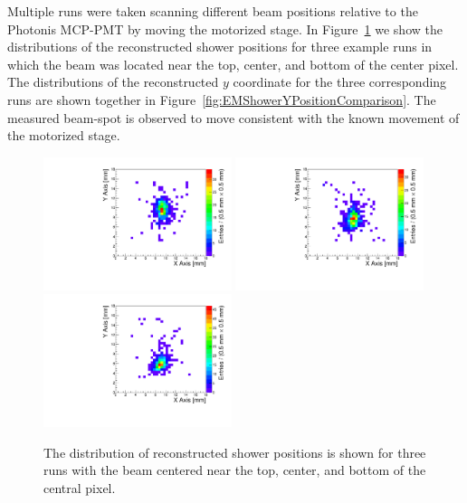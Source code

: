\documentclass[12pt]{article}
\begin{document}
Multiple runs were taken scanning different beam positions relative to the
Photonis MCP-PMT by moving the motorized stage. In
Figure~\ref{fig:EMShowerPositions} we show the distributions of the
reconstructed shower positions for three example runs in which the beam was
located near the top, center, and bottom of the center pixel. The distributions
of the reconstructed $y$ coordinate for the three corresponding runs are shown
together in Figure~\ref{fig:EMShowerYPositionComparison}. The measured beam-spot
is observed to move consistent with the known movement of the motorized stage.

\begin{figure}[htbp] \centering
\includegraphics[width=0.49\textwidth]{Images/centers/run30dist.pdf}
\includegraphics[width=0.49\textwidth]{Images/centers/run32dist.pdf}
\includegraphics[width=0.49\textwidth]{Images/centers/run34dist.pdf}
\caption{The distribution of reconstructed shower positions is shown for three
runs with the beam centered near the top, center, and bottom of the central
pixel. } \label{fig:EMShowerPositions} \end{figure} \begin{figure}[htbp]


\end{figure}
\end{document}
